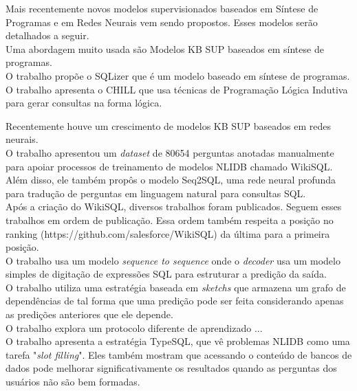 \documentclass{article}
\begin{document}
Mais recentemente novos modelos supervisionados baseados em Síntese de Programas e em Redes Neurais vem sendo propostos. Esses modelos serão detalhados a seguir.\\

Uma abordagem muito usada são Modelos KB SUP baseados em síntese de programas.\\

O trabalho \citep{yaghmazadeh2017sqlizer} propõe o SQLizer que é um modelo baseado em síntese de programas. \\

O trabalho \citep{zelle1996learning} apresenta o CHILL que usa técnicas de Programação Lógica Indutiva para gerar consultas na forma lógica.

Recentemente houve um crescimento de modelos KB SUP baseados em redes neurais.\\

O trabalho \citep{zhong2017seq2sql} apresentou um \textit{dataset} de 80654 perguntas anotadas manualmente para apoiar processos de treinamento de modelos NLIDB chamado WikiSQL. Além disso, ele também propôs o modelo Seq2SQL, uma rede neural profunda para tradução de perguntas em linguagem natural para consultas SQL. \\

Após a criação do WikiSQL, diversos trabalhos foram publicados. Seguem esses trabalhos em ordem de publicação. Essa ordem também respeita a posição no ranking (https://github.com/salesforce/WikiSQL) da última para a primeira posição.\\

O trabalho \citep{wang2018pointing} usa um modelo \textit{sequence to sequence} onde o \textit{decoder} usa um modelo simples de digitação de expressões SQL para estruturar a predição da saída. \\

O trabalho \citep{xu2017sqlnet} utiliza uma estratégia baseada em \textit{sketchs} que armazena um grafo de dependências de tal forma que uma predição pode ser feita considerando apenas as predições anteriores que ele depende. \\

O trabalho \citep{huang2018natural} explora um protocolo diferente de aprendizado ... \\

O trabalho \citep{yu2018typesql} apresenta a estratégia TypeSQL, que vê problemas NLIDB como uma tarefa "\textit{slot filling}". Eles também mostram que acessando o conteúdo de bancos de dados pode melhorar significativamente os resultados quando as perguntas dos usuários não são bem formadas. \\
\end{document}

